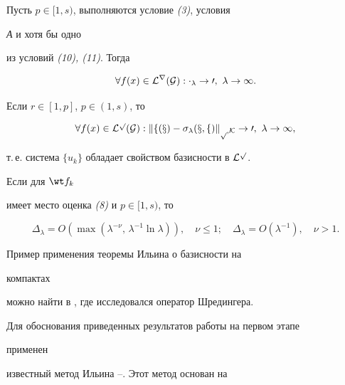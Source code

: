 \begin{thm} Пусть $p\in[1,s)$, выполняются условие {\em (3)}, условия


{\em А} и хотя бы одно


из условий {\em (10), (11)}. Тогда


\begin{equation}


\forall f(x)\in\cal L^r(G):\Delta_\lambda\to 0,\ \lambda\to\infty.


\end{equation}


Если $r\in[1,p]$, $p\in(1,s)$, то


\begin{equation}


\forall f(x)\in\cal L^p(G):\|f(x)-\sigma_\lambda(x,f)\|_{p,K}


\to 0, \ \lambda\to\infty,


\end{equation}


т.\,е. система $\{u_k\}$ обладает свойством базисности в $\cal L^p$.


Если для $\wt f_k$


имеет место оценка {\em (8)} и $p\in[1,s)$, то


\begin{equation}


\Delta_\lambda=O(\max(\lambda^{-\nu},\,\lambda^{-1}\ln\lambda)),


\quad \nu\le 1;\quad \Delta_\lambda=O(\lambda^{-1}),\quad


\nu>1.


\end{equation}


\end{thm}





\begin{note} Пример применения теоремы Ильина о базисности на


компактах


можно найти в \cite{9}, где исследовался оператор Шредингера.


\end{note}





Для обоснования приведенных результатов работы на первом этапе


применен


известный метод Ильина \cite{1}--\cite{4}. Этот метод основан на


